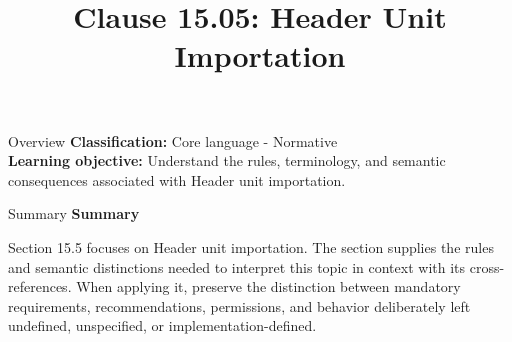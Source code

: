 \documentclass[10pt,letterpaper]{article}
\title{Clause 15.05: Header Unit Importation}
\author{}
\date{}
\begin{document}
\maketitle
\begin{CornellOverviewBox}{Overview}
\textbf{Classification:} Core language - Normative\\[2pt]
\textbf{Learning objective:} Understand the rules, terminology, and semantic consequences associated with Header unit importation.
\end{CornellOverviewBox}\begin{CornellSummaryBox}{Summary}
{\sffamily\bfseries\color{Accent} Summary}\par\vspace{3pt}Section 15.5 focuses on Header unit importation. The section supplies the rules and semantic distinctions needed to interpret this topic in context with its cross-references. When applying it, preserve the distinction between mandatory requirements, recommendations, permissions, and behavior deliberately left undefined, unspecified, or implementation-defined.
\end{CornellSummaryBox}
\end{document}
